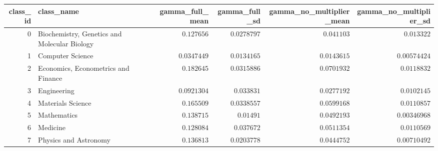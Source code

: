 \begin{tabular}{rlrrrr}
\toprule
class\_id & class\_name & gamma\_full\_mean & gamma\_full\_sd & gamma\_no\_multiplier\_mean & gamma\_no\_multiplier\_sd \\
\midrule
0 & Biochemistry, Genetics and Molecular Biology & $0.127656$ & $0.0278797$ & $0.041103$ & $0.013322$ \\
1 & Computer Science & $0.0347449$ & $0.0134165$ & $0.0143615$ & $0.00574424$ \\
2 & Economics, Econometrics and Finance & $0.182645$ & $0.0315886$ & $0.0701932$ & $0.0118832$ \\
3 & Engineering & $0.0921304$ & $0.033831$ & $0.0277192$ & $0.0102145$ \\
4 & Materials Science & $0.165509$ & $0.0338557$ & $0.0599168$ & $0.0110857$ \\
5 & Mathematics & $0.138715$ & $0.01491$ & $0.0492193$ & $0.00346968$ \\
6 & Medicine & $0.128084$ & $0.037672$ & $0.0511354$ & $0.0110569$ \\
7 & Physics and Astronomy & $0.136813$ & $0.0203778$ & $0.0444752$ & $0.00710492$ \\
\bottomrule
\end{tabular}
